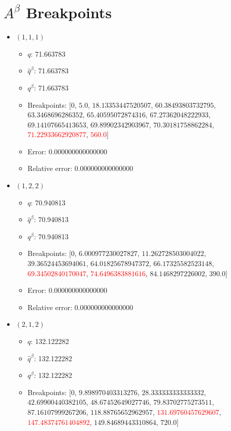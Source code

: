 \documentclass{article}%
\begin{document}
\section{$A^\beta$ Breakpoints}%
\thispagestyle{plain}%
\begin{itemize}%
	\item $(1, 1, 1)$%
	\begin{itemize}%
		\item $q$: 71.663783%
		\item $\hat{q}^\beta$: 71.663783%
		\item $q^\beta$: 71.663783%
		\item Breakpoints: $[$$0$, $5.0$, $18.13353447520507$, $60.38493803732795$, $63.3468696286352$, $65.40595072874316$, $67.27362048222933$, $69.14107665413653$, $69.89902342903967$, $70.30181758862284$, \textcolor{red}{$71.22933662920877$}, \textcolor{red}{$560.0$}$]$%
		\item Error: 0.000000000000000%
		\item Relative error: 0.000000000000000%
	\end{itemize}%
	\item $(1, 2, 2)$%
	\begin{itemize}%
		\item $q$: 70.940813%
		\item $\hat{q}^\beta$: 70.940813%
		\item $q^\beta$: 70.940813%
		\item Breakpoints: $[$$0$, $6.000977230027827$, $11.262728503004022$, $39.36524453694061$, $64.01825678947372$, $66.17325582523148$, \textcolor{red}{$69.34502840170047$}, \textcolor{red}{$74.6496383881616$}, $84.1468297226002$, $390.0$$]$%
		\item Error: 0.000000000000000%
		\item Relative error: 0.000000000000000%
	\end{itemize}%
	\item $(2, 1, 2)$%
	\begin{itemize}%
		\item $q$: 132.122282%
		\item $\hat{q}^\beta$: 132.122282%
		\item $q^\beta$: 132.122282%
		\item Breakpoints: $[$$0$, $9.898970403313276$, $28.333333333333332$, $42.69900440382105$, $48.67452649027746$, $79.83702775273511$, $87.16107999267206$, $118.88765652962957$, \textcolor{red}{$131.69760457629607$}, \textcolor{red}{$147.48374761404892$}, $149.84689443310864$, $720.0$$]$%

\end{itemize}
\end{itemize}
\end{document}
